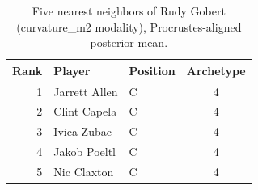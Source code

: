 \begin{table}[htbp]
  \centering\small
  \begin{tabular}{rllc}
    \toprule
    Rank & Player & Position & Archetype \\
    \midrule
    1 & Jarrett Allen & C & 4 \\
    2 & Clint Capela & C & 4 \\
    3 & Ivica Zubac & C & 4 \\
    4 & Jakob Poeltl & C & 4 \\
    5 & Nic Claxton & C & 4 \\
    \bottomrule
  \end{tabular}
  \caption{Five nearest neighbors of Rudy Gobert (curvature_m2 modality), Procrustes-aligned posterior mean.}
  \label{tab:Rudy_Gobert_neighbors_curvature_m2}
\end{table}

